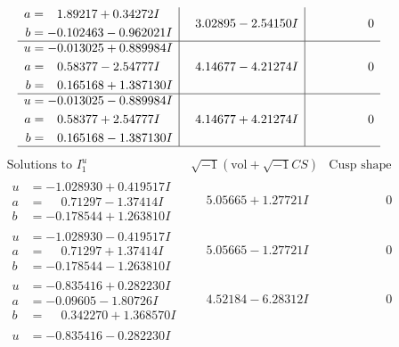 \documentclass[1p]{elsarticle_modified}
\theoremstyle{definition}
\newcommand{\I}{\sqrt{-1}}
\begin{document}
$$\begin{array}{c|c|c}
\begin{aligned}
a &= \phantom{-}1.89217 + 0.34272 I \\
b &= -0.102463 - 0.962021 I\end{aligned}
 & \phantom{-}3.02895 - 2.54150 I & \phantom{-0.000000 } 0 \\ \hline\begin{aligned}
u &= -0.013025 + 0.889984 I \\
a &= \phantom{-}0.58377 - 2.54777 I \\
b &= \phantom{-}0.165168 + 1.387130 I\end{aligned}
 & \phantom{-}4.14677 - 4.21274 I & \phantom{-0.000000 } 0 \\ \hline\begin{aligned}
u &= -0.013025 - 0.889984 I \\
a &= \phantom{-}0.58377 + 2.54777 I \\
b &= \phantom{-}0.165168 - 1.387130 I\end{aligned}
 & \phantom{-}4.14677 + 4.21274 I & \phantom{-0.000000 } 0\\
 \hline 
 \end{array}$$\newpage$$\begin{array}{c|c|c}  
\text{Solutions to }I^u_{1}& \I (\text{vol} + \sqrt{-1}CS) & \text{Cusp shape}\\
 \hline 
\begin{aligned}
u &= -1.028930 + 0.419517 I \\
a &= \phantom{-}0.71297 - 1.37414 I \\
b &= -0.178544 + 1.263810 I\end{aligned}
 & \phantom{-}5.05665 + 1.27721 I & \phantom{-0.000000 } 0 \\ \hline\begin{aligned}
u &= -1.028930 - 0.419517 I \\
a &= \phantom{-}0.71297 + 1.37414 I \\
b &= -0.178544 - 1.263810 I\end{aligned}
 & \phantom{-}5.05665 - 1.27721 I & \phantom{-0.000000 } 0 \\ \hline\begin{aligned}
u &= -0.835416 + 0.282230 I \\
a &= -0.09605 - 1.80726 I \\
b &= \phantom{-}0.342270 + 1.368570 I\end{aligned}
 & \phantom{-}4.52184 - 6.28312 I & \phantom{-0.000000 } 0 \\ \hline\begin{aligned}
u &= -0.835416 - 0.282230 I \\

\end{aligned}
\end{array}$$
\end{document}
